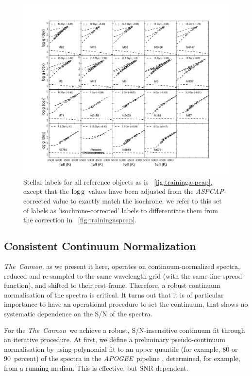 \documentclass[12pt, preprint]{aastex}
\newcommand{\logg}{\mbox{$\rm \log g$}}
\newcommand{\tc}{\textsl{The~Cannon}}
\newcommand{\apogee}{\textsl{APOGEE}}
\newcommand{\aspcap}{\textsl{ASPCAP}}
\begin{document}
\begin{figure}[h!]
\centering
  \includegraphics[scale=0.33]{./plots/training_mkn2.pdf}
\caption{Stellar labels for all reference objects as is \figurename~\ref{fig:trainingaspcap}, except that the \logg\ values have been adjusted from the \aspcap-corrected value to exactly match the isochrone, we refer to this set of labels as  'isochrone-corrected' labels to differentiate them from the correction in \figurename~\ref{fig:trainingaspcap}.  }
\label{fig:trainingisochrone}
\end{figure}


\subsection{Consistent Continuum Normalization}\label{sec:ContNorm}

\tc, as we present it here, operates on continuum-normalized spectra, reduced and re-sampled to the same wavelength grid (with the same line-spread function), and shifted to their rest-frame. 
 Therefore, a robust continuum normalisation of the spectra is critical.
It turns out that it is of particular importance to have an operational procedure to set the continuum,
that shows no systematic dependence on the S/N of the spectra.

For the \tc\ we achieve a robust, S/N-insensitive continuum fit through 
an iterative procedure. At first, we define a preliminary pseudo-continuum normalisation by 
using polynomial fit to an upper quantile (for example, 80 or 90~percent) of the spectra
 in the \apogee\ pipeline \citep{Meszaros2013}, determined, for example, from a running median.
  This is effective, but SNR dependent.
  
\end{document}
